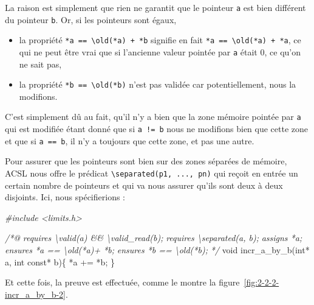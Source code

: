 \documentclass[12pt,francais,]{scrbook}
\newenvironment{Shaded}{}{}
\newcommand{\DataTypeTok}[1]{\textcolor[rgb]{0.56,0.13,0.00}{{#1}}}
\newcommand{\CommentTok}[1]{\textcolor[rgb]{0.38,0.63,0.69}{\textit{{#1}}}}
\newcommand{\NormalTok}[1]{{#1}}
\providecommand{\tightlist}{%
  \setlength{\itemsep}{0pt}\setlength{\parskip}{0pt}}
\newenvironment{zdsexampleblock}[1]{%
  \tcolorbox[beamer,%
    noparskip,breakable,
    colback=LightGreen,colframe=DarkGreen,%
    colbacklower=LimeGreen,%
    title=#1]
}{\endtcolorbox}
\begin{document}
La raison est simplement que rien ne garantit que le pointeur \texttt{a}
est bien différent du pointeur \texttt{b}. Or, si les pointeurs sont
égaux,

\begin{itemize}
\tightlist
\item
  la propriété \texttt{*a\ ==\ \textbackslash{}old(*a)\ +\ *b} signifie
  en fait \texttt{*a\ ==\ \textbackslash{}old(*a)\ +\ *a}, ce qui ne
  peut être vrai que si l'ancienne valeur pointée par \texttt{a} était
  0, ce qu'on ne sait pas,
\item
  la propriété \texttt{*b\ ==\ \textbackslash{}old(*b)} n'est pas
  validée car potentiellement, nous la modifions.
\end{itemize}

\begin{zdsexampleblock}{Pourquoi la clause assign est-elle validée ?}
  C'est simplement dû au fait, qu'il n'y a
  bien que la zone mémoire pointée par \texttt{a} qui est
  modifiée étant donné que si \texttt{a\ !=\ b} nous ne modifions bien
  que cette zone et que si \texttt{a\ ==\ b}, il n'y a toujours
  que cette zone, et pas une autre.
\end{zdsexampleblock}

Pour assurer que les pointeurs sont bien sur des zones séparées de
mémoire, ACSL nous offre le prédicat
\texttt{\textbackslash{}separated(p1,\ ...,\ pn)} qui reçoit en entrée
un certain nombre de pointeurs et qui va nous assurer qu'ils sont deux à
deux disjoints. Ici, nous spécifierions :

\begin{footnotesize}\begin{Shaded}
\begin{Highlighting}[]
\CommentTok{#include <limits.h>}

\CommentTok{/*@}
\CommentTok{  requires \textbackslash{}valid(a) && \textbackslash{}valid_read(b);}
\CommentTok{  requires \textbackslash{}separated(a, b);}
\CommentTok{  assigns  *a;}
\CommentTok{  ensures  *a == \textbackslash{}old(*a)+ *b;}
\CommentTok{  ensures  *b == \textbackslash{}old(*b);}
\CommentTok{*/}
\DataTypeTok{void} \NormalTok{incr_a_by_b(}\DataTypeTok{int}\NormalTok{* a, }\DataTypeTok{int} \DataTypeTok{const}\NormalTok{* b)\{}
  \NormalTok{*a += *b;}
\NormalTok{\}}
\end{Highlighting}
\end{Shaded}\end{footnotesize}

Et cette fois, la preuve est effectuée, comme le montre la
figure~\ref{fig:2-2-2-incr_a_by_b-2}.
\end{document}
